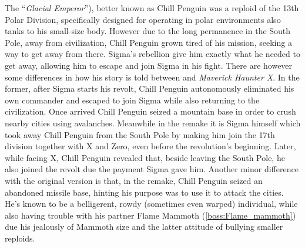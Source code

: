 The ``\textit{Glacial Emperor}''\cite{book:MMX_Complete_art}), better known as Chill Penguin was a reploid of the 13th Polar Division, specifically designed for operating in polar environments also tanks to his small-size body. However due to the long permanence in the South Pole, away from civilization, Chill Penguin grown tired of his mission, seeking a way to get away from there. Sigma's rebellion give him exactly what he needed to get away, allowing him to escape and join Sigma in his fight. There are however some differences in how his story is told between \x and \textit{Maverick Haunter X}. In the former, after Sigma starts his revolt, Chill Penguin autonomously eliminated his own commander and escaped to join Sigma while also returning to the civilization\cite{Xcoll1:Manual_X1}. Once arrived Chill Penguin seized a mountain base in order to crush nearby cities using avalanches. Meanwhile in the remake it is Sigma himself which took away Chill Penguin from the South Pole by making him join the 17th division together with X and Zero, even before the revolution's beginning\cite{MHX:manual}. Later, while facing X, Chill Penguin revealed that, beside leaving the South Pole, he also joined the revolt due the payment Sigma gave him\cite{wiki:MMX_script}. Another minor difference with the original version is that, in the remake, Chill Penguin seized an abandoned missile base, hinting his purpose was to use it to attack the cities. He's known to be a belligerent, rowdy (sometimes even warped) individual, while also having trouble with his partner Flame Mammoth (\ref{boss:Flame_mammoth}) due his jealously of Mammoth size and the latter attitude of bullying smaller reploids.


